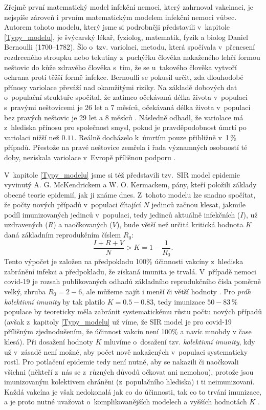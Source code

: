 Zřejmě první matematický model infekční nemoci, který zahrnoval vakcinaci, je nejspíše zároveň i prvním matematickým modelem infekční nemoci vůbec. Autorem tohoto modelu, který jsme si podrobněji představili v~kapitole \ref{Typy_modelu}, je švýcarský lékař, fyziolog, matematik, fyzik a biolog Daniel Bernoulli (1700--1782). Šlo o~tzv. variolaci, metodu, která spočívala v~přenesení rozdrceného stroupku nebo tekutiny z~puchýřku člověka nakaženého lehčí formou neštovic do kůže zdravého člověka s~tím, že se u~takového člověka vytvoří ochrana proti těžší formě infekce. Bernoulli se pokusil určit, zda dlouhodobé přínosy variolace převáží nad okamžitými riziky. Na základě dobových dat o~populační struktuře spočítal, že zatímco očekávaná délka života v~populaci s~pravými neštovicemi je 26 let a 7 měsíců, očekávaná délka života v~populaci bez pravých neštovic je 29 let a 8 měsíců \cite{Bacaer2011}. Následně odhadl, že variolace má z~hlediska přínosu pro společnost smysl, pokud je pravděpodobnost úmrtí po variolaci nižší než $0.11$. Reálně docházelo k~úmrtím pouze přibližně v~1\,\% případů. Přestože na pravé neštovice zemřela i řada významných osobností té doby, nezískala variolace v~Evropě přílišnou podporu \cite{Bacaer2011}.

V~kapitole \ref{Typy_modelu} jsme si též představili tzv.\ SIR model epidemie vyvinutý A. G. McKendrickem a W. O. Kermackem, pány, kteří položili základy obecné teorie epidemií, jak ji známe dnes. Z~tohoto modelu lze snadno spočítat, že počty nových případů v~populaci čítající $N$ jedinců začnou klesat, jakmile podíl imunizovaných jedinců v~populaci, tedy jedinců aktuálně infekčních ($I$), už uzdravených ($R$) a naočkovaných ($V$), bude větší než určitá kritická hodnota $K$ daná základním reprodukčním číslem $R_0$:
\begin{equation}
\frac{I+R+V}{N} > K = 1-\frac{1}{R_0}.
\end{equation}
Tento výpočet je založen na předpokladu 100\% účinnosti vakcíny z~hlediska zabránění infekci a předpokladu, že získaná imunita je trvalá. V~případě nemoci covid-19 je rozsah publikovaných odhadů základního reprodukčního čísla poměrně velký, zhruba $R_0 = 2-6$, ale můžeme najít i menší či větší hodnoty \cite[a uvnitř citované reference]{Billah_etal2020,Locatelli_etal2021}. Pro \emph{práh kolektivní imunity} by tak platilo $K = 0.5-0.83$, tedy imunizace $50-83\,\%$ populace by teoreticky měla zabránit systematickému růstu počtu nových případů (avšak z~kapitoly \ref{Typy_modelu} už víme, že SIR model je pro covid-19 přílišným zjednodušením, že účinnost vakcín není 100\% a navíc mnohdy v čase klesá). Při dosažení hodnoty $K$ mluvíme o~dosažení tzv. \emph{kolektivní imunity}, kdy už v~zásadě není možné, aby počet nově nakažených v~populaci systematicky rostl. Pro potlačení epidemie tedy není nutné, aby se nakazili či naočkovali všichni (někteří z~nás se z~různých důvodů očkovat ani nemohou), protože jsou imunizovaným kolektivem chráněni (z~populačního hlediska) i ti neimunizovaní. Každá vakcína je však nedokonalá jak co do účinnosti, tak co to trvání imunizace, a je proto nutné uvažovat o~komplikovanějších modelech a vyšších hodnotách $K$ \cite{K1,K2}.


